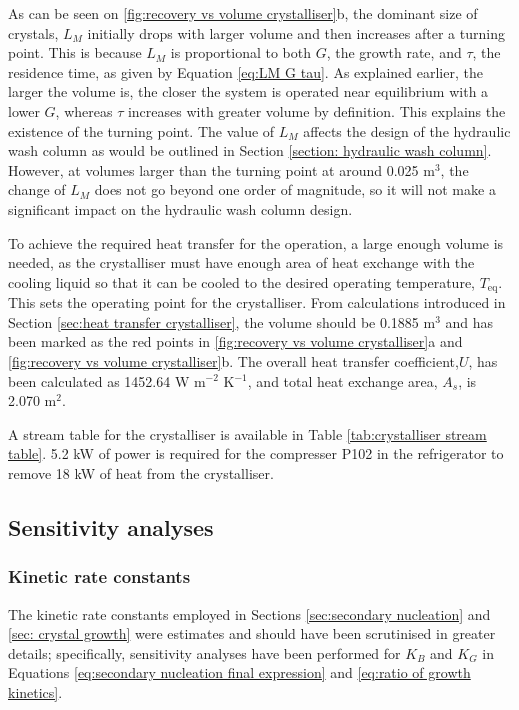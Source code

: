 As can be seen on \cref{fig:recovery vs volume crystalliser}b, the dominant size of crystals, $L_M$ initially drops with larger volume and then increases after a turning point. This is because $L_M$ is proportional to both $G$, the growth rate, and $\tau$, the residence time, as given by Equation \ref{eq:LM G tau}. As explained earlier, the larger the volume is, the closer the system is operated near equilibrium with a lower $G$, whereas $\tau$ increases with greater volume by definition. This explains the existence of the turning point. The value of $L_M$ affects the design of the hydraulic wash column as would be outlined in Section \ref{section: hydraulic wash column}. However, at volumes larger than the turning point at around 0.025 m$^3$, the change of $L_M$ does not go beyond one order of magnitude, so it will not make a significant impact on the hydraulic wash column design. 

To achieve the required heat transfer for the operation, a large enough volume is needed, as the crystalliser must have enough area of heat exchange with the cooling liquid so that it can be cooled to the desired operating temperature, $T_{\mathrm{eq}}$. This sets the operating point for the crystalliser. From calculations introduced in Section \ref{sec:heat transfer crystalliser}, the volume should be 0.1885 m$^3$ and has been marked as the red points in \cref{fig:recovery vs volume crystalliser}a and \cref{fig:recovery vs volume crystalliser}b. The overall heat transfer coefficient,$U$, has been calculated as 1452.64 W m$^{-2}$ K$^{-1}$, and total heat exchange area, $A_s$, is 2.070 m$^2$. 

A stream table for the crystalliser is available in Table \ref{tab:crystalliser stream table}. 5.2 kW of power is required for the compresser P102 in the refrigerator to remove 18 kW of heat from the crystalliser. 

\subsection{Sensitivity analyses}

\subsubsection{Kinetic rate constants}\label{sec:kinetics sensitivity}

The kinetic rate constants employed in Sections \ref{sec:secondary nucleation} and \ref{sec: crystal growth} were estimates and should have been scrutinised in greater details; specifically, sensitivity analyses have been performed for $K_B$ and $K_G$ in Equations \ref{eq:secondary nucleation final expression} and \ref{eq:ratio of growth kinetics}.

